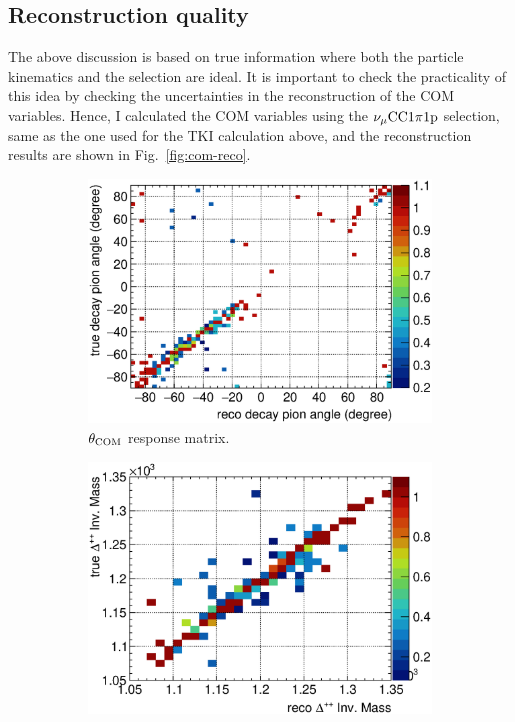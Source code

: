      \subsection{Reconstruction quality}
     \label{sec:com-reco}
     The above discussion is based on true information where both the particle kinematics and the selection are ideal.
     It is important to check the practicality of this idea by checking the uncertainties in the reconstruction of the COM variables.
     Hence, I calculated the COM variables using the $\nu_{\mu}\textrm{CC}1\pi1\textrm{p}$ selection, same as the one used for the TKI calculation above, and the reconstruction results are shown in Fig.~\ref{fig:com-reco}.
     \begin{figure}
          \begin{subfigure}[b]{\dbfigwid\textwidth}
               \centering
               \includegraphics[width=\textwidth]{figures/COM/SFGpTPCmu_dang_colnor_resmat_al15.eps}
               \caption{$\theta_{\textrm{COM}}$ response matrix.}
               \label{subfig:reco-com-t-resmat}
          \end{subfigure}         
          \begin{subfigure}[b]{\dbfigwid\textwidth}
               \centering
               \includegraphics[width=\textwidth]{figures/COM/SFGpTPCmu_edelta_colnor_resmat_al15.eps}

\end{subfigure}
\end{figure}
